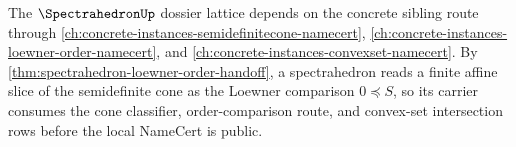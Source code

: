 The $\SpectrahedronUp$ dossier lattice depends on the concrete sibling route through \autoref{ch:concrete-instances-semidefinitecone-namecert}, \autoref{ch:concrete-instances-loewner-order-namecert}, and \autoref{ch:concrete-instances-convexset-namecert}. By \autoref{thm:spectrahedron-loewner-order-handoff}, a spectrahedron reads a finite affine slice of the semidefinite cone as the Loewner comparison $0 \preceq S$, so its carrier consumes the cone classifier, order-comparison route, and convex-set intersection rows before the local NameCert is public.
